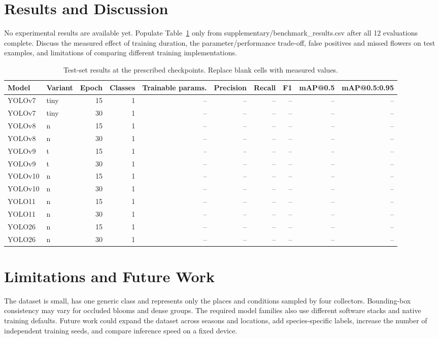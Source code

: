 \documentclass[conference]{IEEEtran}
\begin{document}
\section{Results and Discussion}
No experimental results are available yet. Populate Table~\ref{tab:results} only from supplementary/benchmark\_results.csv after all 12 evaluations complete. Discuss the measured effect of training duration, the parameter/performance trade-off, false positives and missed flowers on test examples, and limitations of comparing different training implementations.

\begin{table}[t]
\caption{Test-set results at the prescribed checkpoints. Replace blank cells with measured values.}
\label{tab:results}
\centering
\small
\begin{tabular}{llrrrrrrrr}
\toprule
Model & Variant & Epoch & Classes & Trainable params. & Precision & Recall & F1 & mAP@0.5 & mAP@0.5:0.95 \\
\midrule
YOLOv7 & tiny & 15 & 1 & -- & -- & -- & -- & -- & -- \\
YOLOv7 & tiny & 30 & 1 & -- & -- & -- & -- & -- & -- \\
YOLOv8 & n & 15 & 1 & -- & -- & -- & -- & -- & -- \\
YOLOv8 & n & 30 & 1 & -- & -- & -- & -- & -- & -- \\
YOLOv9 & t & 15 & 1 & -- & -- & -- & -- & -- & -- \\
YOLOv9 & t & 30 & 1 & -- & -- & -- & -- & -- & -- \\
YOLOv10 & n & 15 & 1 & -- & -- & -- & -- & -- & -- \\
YOLOv10 & n & 30 & 1 & -- & -- & -- & -- & -- & -- \\
YOLO11 & n & 15 & 1 & -- & -- & -- & -- & -- & -- \\
YOLO11 & n & 30 & 1 & -- & -- & -- & -- & -- & -- \\
YOLO26 & n & 15 & 1 & -- & -- & -- & -- & -- & -- \\
YOLO26 & n & 30 & 1 & -- & -- & -- & -- & -- & -- \\
\bottomrule
\end{tabular}
\end{table}

\section{Limitations and Future Work}
The dataset is small, has one generic class and represents only the places and conditions sampled by four collectors. Bounding-box consistency may vary for occluded blooms and dense groups. The required model families also use different software stacks and native training defaults. Future work could expand the dataset across seasons and locations, add species-specific labels, increase the number of independent training seeds, and compare inference speed on a fixed device.
\end{document}
